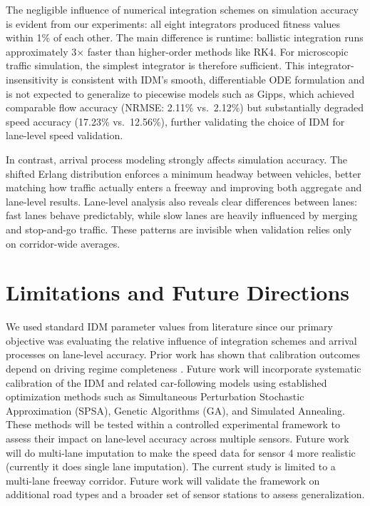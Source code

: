 \documentclass{scspaperproc}
\theoremstyle{scsthe}
\begin{document}
The negligible influence of numerical integration schemes on simulation accuracy is evident from our experiments: all eight integrators produced fitness values within 1\% of each other. The main difference is runtime: ballistic integration runs approximately 3$\times$ faster than higher-order methods like RK4. For microscopic traffic simulation, the simplest integrator is therefore sufficient. This integrator-insensitivity is consistent with IDM's smooth, differentiable ODE formulation and is not expected to generalize to piecewise models such as Gipps, which achieved comparable flow accuracy (NRMSE: 2.11\% vs.\ 2.12\%) but substantially degraded speed accuracy (17.23\% vs.\ 12.56\%), further validating the choice of IDM for lane-level speed validation.

In contrast, arrival process modeling strongly affects simulation accuracy. The shifted Erlang distribution enforces a minimum headway between vehicles, better matching how traffic actually enters a freeway and improving both aggregate and lane-level results. Lane-level analysis also reveals clear differences between lanes: fast lanes behave predictably, while slow lanes are heavily influenced by merging and stop-and-go traffic. These patterns are invisible when validation relies only on corridor-wide averages.


\section{Limitations and Future Directions}

We used standard IDM parameter values from literature since our primary
objective was evaluating the relative influence of integration schemes and
arrival processes on lane-level accuracy. Prior work has shown that
calibration outcomes depend on driving regime completeness
\cite{sharma2019more}. Future work will incorporate systematic
calibration of the IDM and related car-following models using established optimization
methods such as Simultaneous Perturbation Stochastic Approximation (SPSA), Genetic
Algorithms (GA), and Simulated Annealing. These methods will be tested within a controlled experimental framework to assess their impact on lane-level accuracy across multiple sensors. Future work will do multi-lane imputation to make the speed data for sensor 4 more realistic (currently it does single lane imputation). The current study is limited to a multi-lane freeway corridor. Future work will validate the framework on additional road types and a broader set of sensor stations to assess generalization.
\end{document}

